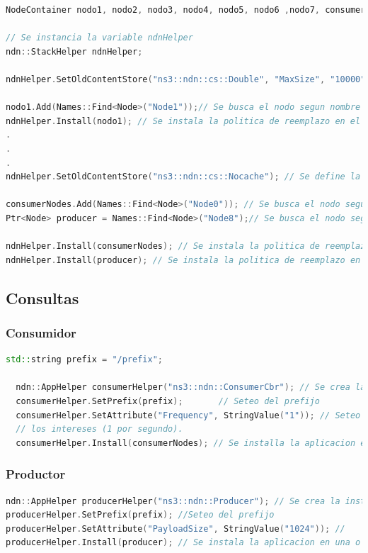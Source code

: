 \documentclass[12pt]{ociamthesis}  %
\begin{document}
\begin{lstlisting}[language=cpp,caption={Caption}]
NodeContainer nodo1, nodo2, nodo3, nodo4, nodo5, nodo6 ,nodo7, consumerNodes;

// Se instancia la variable ndnHelper
ndn::StackHelper ndnHelper;

ndnHelper.SetOldContentStore("ns3::ndn::cs::Double", "MaxSize", "10000");

nodo1.Add(Names::Find<Node>("Node1"));// Se busca el nodo segun nombre
ndnHelper.Install(nodo1); // Se instala la politica de reemplazo en el nodo 1 (ROUTER)
.
.
.
ndnHelper.SetOldContentStore("ns3::ndn::cs::Nocache"); // Se define la politica de NO CACHE

consumerNodes.Add(Names::Find<Node>("Node0")); // Se busca el nodo segun nombre
Ptr<Node> producer = Names::Find<Node>("Node8");// Se busca el nodo segun nombre

ndnHelper.Install(consumerNodes); // Se instala la politica de reemplazo en el nodo CONSUMIDOR
ndnHelper.Install(producer); // Se instala la politica de reemplazo en el nodo PRODUCTOR
\end{lstlisting}


\subsection{Consultas}
\subsubsection{Consumidor}

\begin{lstlisting}[language=cpp,caption={Caption}]
  std::string prefix = "/prefix";
  
  ndn::AppHelper consumerHelper("ns3::ndn::ConsumerCbr"); // Se crea la instancia
  consumerHelper.SetPrefix(prefix);       // Seteo del prefijo
  consumerHelper.SetAttribute("Frequency", StringValue("1")); // Seteo de la frecuencia en que enviara 
  // los intereses (1 por segundo).
  consumerHelper.Install(consumerNodes); // Se installa la aplicacion en uno o mas nodos.
\end{lstlisting}


\subsubsection{Productor}
\begin{lstlisting}[language=cpp,caption={Caption}]
ndn::AppHelper producerHelper("ns3::ndn::Producer"); // Se crea la instancia
producerHelper.SetPrefix(prefix); //Seteo del prefijo
producerHelper.SetAttribute("PayloadSize", StringValue("1024")); //
producerHelper.Install(producer); // Se instala la aplicacion en una o mas nodos.
\end{lstlisting}
\end{document}
